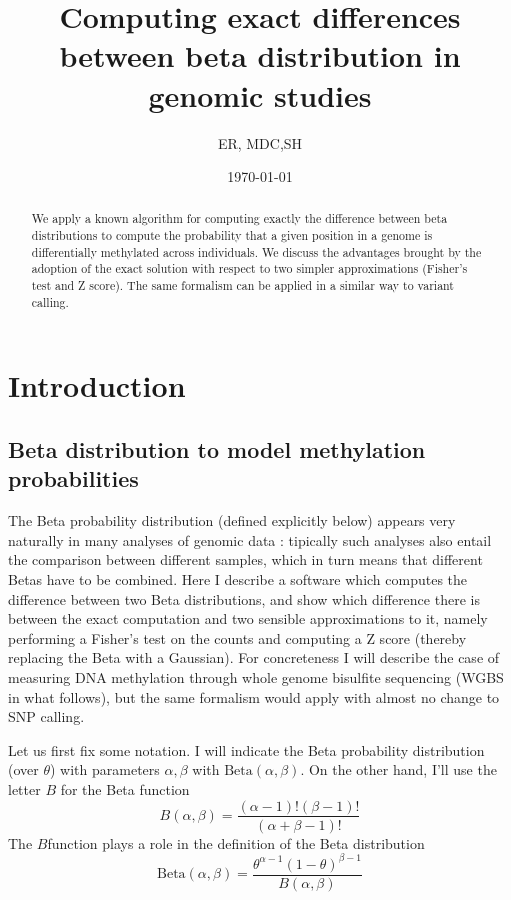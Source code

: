 \documentclass[11pt]{amsart}
\title{Computing exact differences between beta distribution in genomic studies}
\author{ER, MDC,SH}
\date{\today}
\begin{document}
\begin{abstract}
We apply a known algorithm for computing exactly the difference between beta distributions
to compute the probability that a given position in a genome is differentially methylated across
individuals. We discuss the advantages brought by the adoption of the exact solution
with respect to two simpler approximations (Fisher's test and Z score).
The same formalism can be applied in a similar way to variant calling.
\end{abstract}
\maketitle
\section{Introduction}
\subsection{Beta distribution to model methylation probabilities}
The Beta probability distribution (defined explicitly below)  appears very naturally in many analyses of genomic data : tipically such analyses also entail the comparison between different samples, which in turn means that different Betas have to be combined. Here I describe a software which computes the difference between two Beta distributions, and show which difference there is between the exact computation and two sensible approximations to it, namely performing a Fisher's test on the counts and computing a Z score (thereby replacing the Beta with a Gaussian). For concreteness I will describe the case of measuring DNA methylation through whole genome bisulfite sequencing (WGBS in what follows), but the same formalism would apply with almost no change to SNP calling. 

Let us first fix some notation. I will indicate the Beta probability distribution (over $\theta$) with parameters $\alpha,\beta$ with $\mbox{Beta}(\alpha,\beta)$. On the other hand, I'll use the letter $B$ for the Beta function 
\[B(\alpha,\beta)=\frac{(\alpha-1)!(\beta-1)!}{(\alpha+\beta-1)!}\] The $B$function plays a role in the definition of the Beta distribution \[\mbox{Beta}(\alpha,\beta)=\frac{\theta^{\alpha-1}(1-\theta)^{\beta-1}}{B(\alpha,\beta)}\]
 
\end{document}
